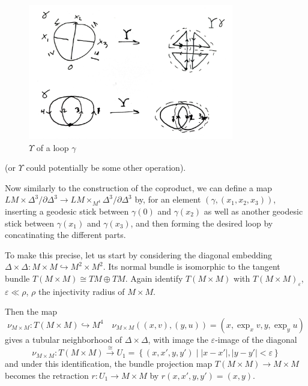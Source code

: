 \documentclass[reqno]{amsart}
\theoremstyle{definition}
\theoremstyle{remark}
\begin{document}
\begin{figure}[htpb]
    \centering
    \includegraphics[width=0.8\textwidth]{Figures/UGWINZKQ.jpeg}
    \caption{$\Upsilon$ of a loop $\gamma$}
    \label{fig:Figures-UGWINZKQ-jpeg}
\end{figure}



(or $\Upsilon$ could potentially be some other operation).


Now similarly to the construction of the coproduct, we can define a map
$LM \times \Delta^{3} /\partial \Delta^3 \to LM \times_{M^{4}} \Delta^{3}
/ \partial \Delta^3$ by,
for an element
$\left( \gamma, \left( x_1,x_2,x_3 \right)  \right) $, inserting
a geodesic stick between $\gamma(0)$ and $\gamma(x_2)$ as well
as another geodesic stick between $\gamma(x_1)$ and 
$\gamma(x_3)$, and then forming the desired loop by concatinating
the different parts.


To make this precise, let us start by
considering the diagonal embedding
$\Delta \times \Delta \colon M \times M 
\hookrightarrow M^2 \times M^2$.
Its normal bundle is isomorphic to
the tangent bundle $T(M \times M) \cong TM \oplus TM$.
Again identify $T\left( M \times M \right) $ with
$T\left( M \times M \right)_{\varepsilon}$,
$\varepsilon \ll \rho$, $\rho$ the injectivity radius of $M \times M$.

Then the map
\[
\nu_{M \times M} \colon T\left( M \times M \right) 
\hookrightarrow M^{4} \quad
\nu_{M \times M}\left( \left( x,v \right) ,
\left( y,u \right) \right) =
\left( x, \exp_x v, y, \exp_y u \right) 
\] 
gives a tubular neighborhood
of $\Delta \times \Delta$, with image the
$\varepsilon$-image of the diagonal
\[
\nu_{M \times M} \colon T\left( M \times M \right) 
\stackrel{\cong}{\to} U_1 
= \left\{ \left( x,x',y,y' \right)  \mid 
\left| x-x' \right| , \left| y-y' \right| < \varepsilon \right\} 
\] 
and under this identification, the bundle projection
map $T\left( M \times M \right) \to M \times M$ becomes
the retraction
$r \colon U_1 \to M \times M$ by
$r\left( x,x',y,y' \right) = \left( x,y \right) $.
\end{document}
